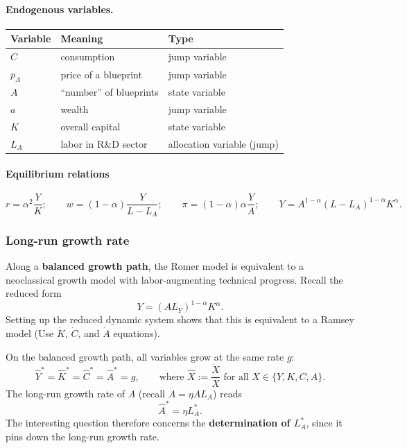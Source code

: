 \paragraph{Endogenous variables.}
\begin{center}
\begin{tabular}{lll}
    \toprule
    \textbf{Variable} & \textbf{Meaning} & \textbf{Type} \\
    \midrule
    $C$    & consumption                & jump variable \\
    $p_A$  & price of a blueprint       & jump variable \\
    $A$    & ``number'' of blueprints   & state variable \\
    $a$    & wealth                     & jump variable \\
    $K$    & overall capital            & state variable \\
    $L_A$  & labor in R\&D sector       & allocation variable (jump) \\
    \bottomrule
\end{tabular}
\end{center}

\paragraph{Equilibrium relations}
\[
    r = \alpha^2 \frac{Y}{K}; \qquad
    w = (1-\alpha)\frac{Y}{L-L_A}; \qquad
    \pi = (1-\alpha)\alpha \frac{Y}{A}; \qquad
    Y = A^{1-\alpha}(L-L_A)^{1-\alpha} K^\alpha.
\]


\subsubsection{Long-run growth rate}
Along a \textbf{balanced growth path}, the Romer model is equivalent to a neoclassical growth model with labor-augmenting technical progress. Recall the reduced form
\[
    Y = (A L_Y)^{1-\alpha} K^\alpha.
\]
Setting up the reduced dynamic system shows that this is equivalent to a Ramsey model (Use $\dot{K}$, $\dot{C}$, and $\dot{A}$ equations).

\noindent On the balanced growth path, all variables grow at the same rate $g$:
\[
    \hat{Y}^* = \hat{K}^* = \hat{C}^* = \hat{A}^* = g, \qquad \text{where } \hat{X} := \frac{\dot{X}}{X} \text{ for all } X \in \{Y, K, C, A\}.
\]
The long-run growth rate of $A$ (recall $\dot{A} = \eta A L_A$) reads
\[
    \hat{A}^* = \eta L_A^*.
\]
The interesting question therefore concerns the \textbf{determination of $L_A^*$}, since it pins down the long-run growth rate.

